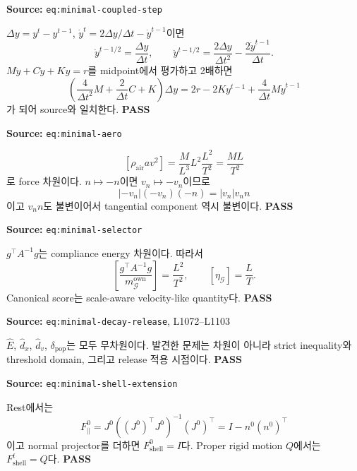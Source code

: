 \documentclass[11pt]{article}
\newcommand{\src}[1]{\textcolor{CoreBlue}{\nolinkurl{#1}}}
\newcommand{\pass}{\textcolor{SafeGreen}{\textbf{PASS}}}
\begin{document}
\begin{tcolorbox}[breakable,colback=white,colframe=black!35,title=Implicit midpoint,fonttitle=\bfseries]
\textbf{Source:} \src{eq:minimal-coupled-step}

$\Delta y=y^t-y^{t-1}$,
$\dot y^t=2\Delta y/\Delta t-\dot y^{t-1}$이면
\[
\dot y^{t-1/2}=\frac{\Delta y}{\Delta t},
\qquad
\ddot y^{t-1/2}
=
\frac{2\Delta y}{\Delta t^2}
-
\frac{2\dot y^{t-1}}{\Delta t}.
\]
$M\ddot y+C\dot y+Ky=r$를 midpoint에서 평가하고 2배하면
\[
\left(
\frac{4}{\Delta t^2}M+
\frac{2}{\Delta t}C+K
\right)\Delta y
=
2r-2Ky^{t-1}+\frac{4}{\Delta t}M\dot y^{t-1}
\]
가 되어 source와 일치한다. \pass
\end{tcolorbox}

\begin{tcolorbox}[breakable,colback=white,colframe=black!35,title=Quasi-steady aero,fonttitle=\bfseries]
\textbf{Source:} \src{eq:minimal-aero}

\[
[\rho_{\mathrm{air}}av^2]
=
\frac{M}{L^3}L^2\frac{L^2}{T^2}
=
\frac{ML}{T^2}
\]
로 force 차원이다. $n\mapsto -n$이면 $v_n\mapsto -v_n$이므로
\[
|{-v_n}|(-v_n)(-n)=|v_n|v_nn
\]
이고 $v_nn$도 불변이어서 tangential component 역시 불변이다. \pass
\end{tcolorbox}

\begin{tcolorbox}[breakable,colback=white,colframe=black!35,title=Selector proxy,fonttitle=\bfseries]
\textbf{Source:} \src{eq:minimal-selector}

$g^\top A^{-1}g$는 compliance energy 차원이다. 따라서
\[
\left[
\frac{g^\top A^{-1}g}{m_{\mathcal G}^{\mathrm{own}}}
\right]
=
\frac{L^2}{T^2},
\qquad
[\eta_{\mathcal G}]=\frac{L}{T}.
\]
Canonical score는 scale-aware velocity-like quantity다. \pass
\end{tcolorbox}

\begin{tcolorbox}[breakable,colback=white,colframe=black!35,title=Release proxies,fonttitle=\bfseries]
\textbf{Source:} \src{eq:minimal-decay-release}, L1072--L1103

$\widehat E$, $\widehat d_x$, $\widehat d_v$, $\delta_{\mathrm{pop}}$는 모두 무차원이다.
발견한 문제는 차원이 아니라 strict inequality와 threshold domain, 그리고 release 적용 시점이다. \pass
\end{tcolorbox}

\begin{tcolorbox}[breakable,colback=white,colframe=black!35,title=Shell affine extension,fonttitle=\bfseries]
\textbf{Source:} \src{eq:minimal-shell-extension}

Rest에서는
\[
F_{\parallel}^0
=J^0((J^0)^\top J^0)^{-1}(J^0)^\top
=I-n^0(n^0)^\top
\]
이고 normal projector를 더하면 $F_{\mathrm{shell}}^0=I$다.
Proper rigid motion $Q$에서는 $F_{\mathrm{shell}}^t=Q$다. \pass
\end{tcolorbox}
\end{document}
